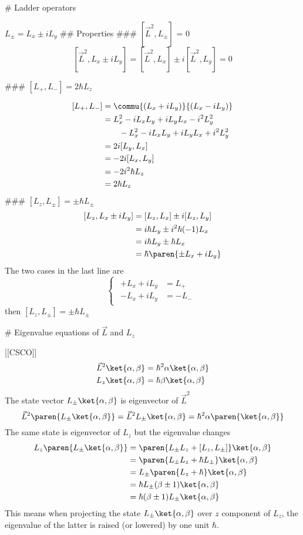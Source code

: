 # Ladder operators

$L_{\pm} = L_x \pm i L_y$
## Properties
### $[\vec L^2, L_\pm]$ = 0
$$
	[\vec L^2,L_x \pm i L_y] = [\vec L^2, L_x] \pm i [\vec L^2, L_y] =0
$$

### $[L_+, L_-] = 2\hbar L_z$

$$
\begin{align}
	[L_+, L_-] &= \commu{(L_x + i L_y)}{(L_x - i L_y)} \\
		&= L_x^2 - iL_xL_y + iL_yL_x - i^2 L_y^2 \\
		&\qquad - L_x^2 - i L_xL_y + iL_yL_x + i^2L_y^2 \\
		&= 2i[L_y, L_x] \\
		&= -2i[L_x, L_y] \\
		&= -2i^2\hbar L_z \\
		&= 2\hbar L_z
\end{align}
$$
### $[L_z, L_\pm] = \pm \hbar L_\pm$
$$
\begin{align}
	[L_z,L_x \pm i L_y] &= [L_z, L_x] \pm i [L_z, L_y] \\
		&= i\hbar L_y \pm i^2\hbar (-1) L_x \\
		&= i\hbar L_y \pm \hbar L_x \\
		&= \hbar\paren{\pm L_x + i L_y}
\end{align}
$$
The two cases in the last line are
$$
\begin{cases}
	\begin{align}
		+L_x + iL_y &= L_+ \\
		-L_x + iL_y &= -L_-
	\end{align}
\end{cases}
$$
then $[L_z, L_\pm] = \pm\hbar L_\pm$ 


# Eigenvalue equations of $\vec L$ and $L_z$

[[CSCO]]
$$
\begin{align}
	\vec L^2 \ket{\alpha, \beta} &= \hbar^2\alpha\ket{\alpha, \beta} \\
	L_z \ket{\alpha, \beta} &= \hbar\beta\ket{\alpha, \beta}
\end{align}
$$
The state vector $L_\pm\ket{\alpha,\beta}$ is eigenvector of $\vec L^2$
$$
	\vec L^2 \paren{L_\pm\ket{\alpha,\beta}} =  \vec L^2 L_\pm\ket{\alpha,\beta} = \hbar^2\alpha\paren{\ket{\alpha,\beta}}
$$
The same state is eigenvector of $L_z$ but the eigenvalue changes
$$
\begin{align}
	L_z \paren{L_\pm\ket{\alpha,\beta}} &= \paren{L_\pm L_z + [L_z, L_\pm]}\ket{\alpha,\beta} \\
	&= \paren{L_\pm L_z + \hbar L_\pm}\ket{\alpha,\beta} \\
	&= L_\pm \paren{L_z + \hbar}\ket{\alpha,\beta} \\
	&= \hbar L_\pm (\beta\pm 1)\ket{\alpha,\beta} \\
	&= \hbar  (\beta\pm 1)L_\pm \ket{\alpha,\beta}
\end{align}
$$
This means when projecting the state $L_\pm\ket{\alpha,\beta}$ over $z$ component of $L_z$, the eigenvalue of the latter is raised (or lowered) by one unit $\hbar$.

